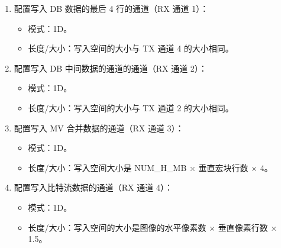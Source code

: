 \documentclass[main\_\_CN.tex]{subfiles}
\begin{document}
\begin{enumerate}
\begin{itemize}
    \end{itemize}
    \item 配置写入 DB 数据的最后 4 行的通道（RX 通道 1）：
    \begin{itemize}
        \item 模式：1D。
        \item 长度/大小：写入空间的大小与 TX 通道 4 的大小相同。
    \end{itemize}
    \item 配置写入 DB 中间数据的通道的通道（RX 通道 2）：
    \begin{itemize}
        \item 模式：1D。
        \item 长度/大小：写入空间的大小与 TX 通道 2 的大小相同。
    \end{itemize}
    \item 配置写入 MV 合并数据的通道（RX 通道 3）：
    \begin{itemize}
        \item 模式：1D。
        \item 长度/大小：写入空间大小是 NUM\_H\_MB × 垂直宏块行数 × 4。
    \end{itemize}
    \item 配置写入比特流数据的通道（RX 通道 4）：
    \begin{itemize}
        \item 模式：1D。
        \item 长度/大小：写入空间的大小是图像的水平像素数 × 垂直像素行数 × 1.5。
    \end{itemize}
\end{enumerate}
\end{document}
